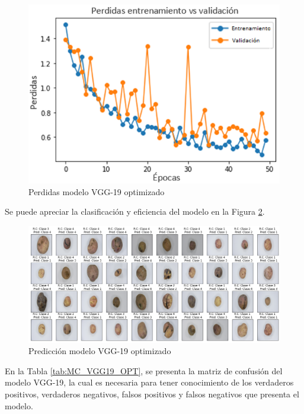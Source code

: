 \begin{figure}[ht]
	\centering
	\includegraphics[scale=0.6]{Figs/505.png}
	\caption{Perdidas modelo VGG-19 optimizado}
	\label{fig:perdda_vgg19_opt}
\end{figure}

\newpage
Se puede apreciar la clasificación y eficiencia del modelo en la Figura \ref{fig:pre_vgg19_opt}.

\begin{figure}[ht]
	\centering
	\includegraphics[scale=0.4]{Figs/506.png}
	\caption{Predicción modelo VGG-19 optimizado}
	\label{fig:pre_vgg19_opt}
\end{figure}

En la Tabla \ref{tab:MC_VGG19_OPT}, se presenta la matriz de confusión del modelo VGG-19, la cual es necesaria para tener conocimiento de los verdaderos positivos, verdaderos negativos, falsos positivos y falsos negativos que presenta el modelo.

